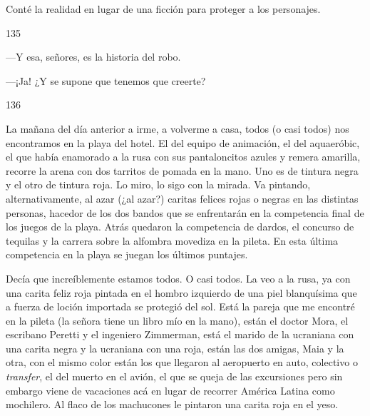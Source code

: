 \documentclass[12pt,twoside,openright,a5paper]{book}
\begin{document}
\nopagebreak

\vspace{0.5cm}

\nopagebreak

Conté la realidad en lugar de una ficción para proteger a los personajes.

\vspace{0.5cm}

\hrulefill \hspace{0.1cm}\decofourleft\hspace{0.2cm} 135 \hspace{0.2cm}\decofourright \hspace{0.1cm}\hrulefill

\nopagebreak

\vspace{0.5cm}

\nopagebreak

---Y esa, señores, es la historia del robo.

---¡Ja! ¿Y se supone que tenemos que creerte?

\vspace{0.5cm}

\hrulefill \hspace{0.1cm}\decofourleft\hspace{0.2cm} 136 \hspace{0.2cm}\decofourright \hspace{0.1cm}\hrulefill

\nopagebreak

\vspace{0.5cm}

\nopagebreak

La mañana del día anterior a irme, a volverme a casa, todos (o casi todos)
nos encontramos en la playa del hotel. El del equipo de animación, el
del aquaeróbic, el que había enamorado a la rusa con sus pantaloncitos
azules y remera amarilla, recorre la arena con dos tarritos de pomada en la
mano. Uno es de tintura negra y el otro de tintura roja. Lo miro, lo sigo
con la mirada. Va pintando, alternativamente, al azar (¿al azar?) caritas
felices rojas o negras en las distintas personas, hacedor de los dos bandos
que se enfrentarán en la competencia final de los juegos de la playa. Atrás
quedaron la competencia de dardos, el concurso de tequilas y la carrera
sobre la alfombra movediza en la pileta. En esta última competencia en la
playa se juegan los últimos puntajes.

Decía que increíblemente estamos todos. O casi todos. La veo a la rusa,
ya con una carita feliz roja pintada en el hombro izquierdo de una piel
blanquísima que a fuerza de loción importada se protegió del sol. Está
la pareja que me encontré en la pileta (la señora tiene un libro mío
en la mano), están el doctor Mora, el escribano Peretti y el ingeniero
Zimmerman, está el marido de la ucraniana con una carita negra y la
ucraniana con una roja, están las dos amigas, Maia y la otra, con el mismo
color están los que llegaron al aeropuerto en auto, colectivo o \emph{transfer},
el del muerto en el avión, el que se queja de las excursiones pero sin
embargo viene de vacaciones acá en lugar de recorrer América Latina como
mochilero. Al flaco de los machucones le pintaron una carita roja en el
yeso. 
\end{document}
